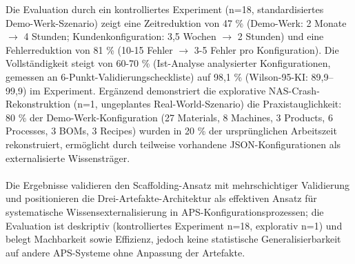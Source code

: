 Die Evaluation durch ein kontrolliertes Experiment (n=18, standardisiertes Demo-Werk-Szenario) zeigt eine Zeitreduktion von 47 \% (Demo-Werk: 2 Monate $\rightarrow$ 4 Stunden; Kundenkonfiguration: 3,5 Wochen $\rightarrow$ 2 Stunden) und eine Fehlerreduktion von 81 \% (10-15 Fehler $\rightarrow$ 3-5 Fehler pro Konfiguration). Die Vollständigkeit steigt von 60-70 \% (Ist-Analyse analysierter Konfigurationen, gemessen an 6-Punkt-Validierungscheckliste) auf 98,1 \% (Wilson-95-KI: 89,9–99,9) im Experiment. Ergänzend demonstriert die explorative NAS-Crash-Rekonstruktion (n=1, ungeplantes Real-World-Szenario) die Praxistauglichkeit: 80 \% der Demo-Werk-Konfiguration (27 Materials, 8 Machines, 3 Products, 6 Processes, 3 BOMs, 3 Recipes) wurden in 20 \% der ursprünglichen Arbeitszeit rekonstruiert, ermöglicht durch teilweise vorhandene JSON-Konfigurationen als externalisierte Wissensträger. \\\\
Die Ergebnisse validieren den Scaffolding-Ansatz mit mehrschichtiger Validierung und positionieren die Drei-Artefakte-Architektur als effektiven Ansatz für systematische Wissensexternalisierung in APS-Konfigurationsprozessen; die Evaluation ist deskriptiv (kontrolliertes Experiment n=18, explorativ n=1) und belegt Machbarkeit sowie Effizienz, jedoch keine statistische Generalisierbarkeit auf andere APS-Systeme ohne Anpassung der Artefakte.

